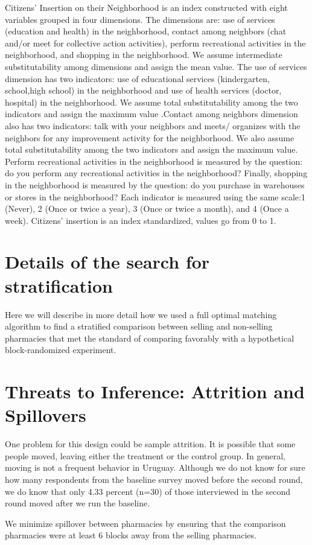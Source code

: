 \documentclass[11pt]{article}
\begin{document}
Citizens' Insertion on their Neighborhood is an index constructed with eight variables grouped in four dimensions. The dimensions are: use of services (education and health) in the neighborhood, contact among neighbors (chat and/or meet for collective action activities), perform recreational activities in the neighborhood, and shopping in the neighborhood. We assume intermediate substitutability among dimensions and assign the mean value. The use of services dimension has two indicators: use of educational services (kindergarten, school,high school) in the neighborhood and use of health services (doctor, hospital) in the neighborhood. We assume total substitutability among the two indicators and assign the maximum value  \citep{goertz2006social}.Contact among neighbors dimension also has two indicators: talk with your neighbors and meets/ organizes with the neighbors for any improvement activity for the neighborhood. We also assume total substitutability among the two indicators and assign the maximum value. Perform recreational activities in the neighborhood is measured by the question: do you perform any recreational activities in the neighborhood? Finally, shopping in the neighborhood is measured by the question: do you purchase in warehouses or stores in the neighborhood? Each indicator is measured using the same scale:1 (Never), 2 (Once or twice a year), 3 (Once or twice a month), and 4 (Once a week).  Citizens' insertion is an index standardized, values go from 0 to 1.

\section{Details of the search for stratification}
Here we will describe in more detail how we used a full optimal matching algorithm \citep{hansen:2004} to find a stratified comparison between selling and non-selling pharmacies that met the standard of comparing favorably with a hypothetical block-randomized experiment.

\section{Threats to Inference: Attrition and Spillovers}
One problem for this design could be sample attrition. It is possible that some people moved, leaving either the treatment or the control group. In general, moving is not a frequent behavior in Uruguay. Although we do not know for sure how many respondents from the baseline survey moved before the second round, we do know that only 4.33 percent (n=30) of those interviewed in the second round moved after we run the baseline.

We minimize spillover between pharmacies by ensuring that the comparison pharmacies were at least 6 blocks away from the selling pharmacies.
\end{document}
